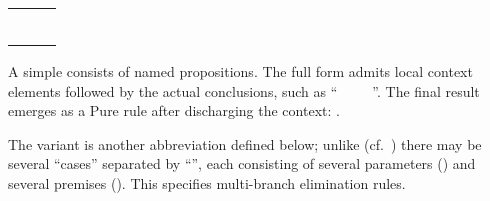 \begin{isabellebody}
\begin{isamarkuptext}
  \medskip
  \begin{tabular}{rcl}
  \isa{{\isachardoublequote}statement{\isachardoublequote}} & \isa{{\isachardoublequote}{\isasymequiv}{\isachardoublequote}} & \isa{{\isachardoublequote}name{\isacharcolon}\ props\ {\isasymAND}\ {\isasymdots}{\isachardoublequote}} \\
  & \isa{{\isachardoublequote}{\isacharbar}{\isachardoublequote}} & \isa{{\isachardoublequote}context\isactrlsup {\isacharasterisk}\ conclusion{\isachardoublequote}} \\[0.5ex]

  \isa{{\isachardoublequote}context{\isachardoublequote}} & \isa{{\isachardoublequote}{\isasymequiv}{\isachardoublequote}} & \isa{{\isachardoublequote}{\isasymFIXES}\ vars\ {\isasymAND}\ {\isasymdots}{\isachardoublequote}} \\
  & \isa{{\isachardoublequote}{\isacharbar}{\isachardoublequote}} & \isa{{\isachardoublequote}{\isasymASSUMES}\ name{\isacharcolon}\ props\ {\isasymAND}\ {\isasymdots}{\isachardoublequote}} \\

  \isa{{\isachardoublequote}conclusion{\isachardoublequote}} & \isa{{\isachardoublequote}{\isasymequiv}{\isachardoublequote}} & \isa{{\isachardoublequote}{\isasymSHOWS}\ name{\isacharcolon}\ props\ {\isasymAND}\ {\isasymdots}{\isachardoublequote}} \\
  & \isa{{\isachardoublequote}{\isacharbar}{\isachardoublequote}} & \isa{{\isachardoublequote}{\isasymOBTAINS}\ vars\ {\isasymAND}\ {\isasymdots}\ {\isasymWHERE}\ name{\isacharcolon}\ props\ {\isasymAND}\ {\isasymdots}\ \ \ {\isasymBBAR}\ \ \ {\isasymdots}{\isachardoublequote}}
  \end{tabular}

  \medskip\noindent A simple  consists of named
  propositions.  The full form admits local context elements followed
  by the actual conclusions, such as ``\hyperlink{keyword.fixes}{\mbox{}}~~\hyperlink{keyword.assumes}{\mbox{}}~~\hyperlink{keyword.shows}{\mbox{}}~''.  The final result emerges as a Pure rule after discharging
  the context: .

  The \hyperlink{keyword.obtains}{\mbox{}} variant is another abbreviation defined
  below; unlike \hyperlink{command.obtain}{\mbox{}} (cf.\
  ) there may be several ``cases''
  separated by ``\isa{{\isachardoublequote}{\isasymBBAR}{\isachardoublequote}}'', each consisting of several
  parameters (\isa{{\isachardoublequote}vars{\isachardoublequote}}) and several premises ().
  This specifies multi-branch elimination rules.


\end{isamarkuptext}
\end{isabellebody}
